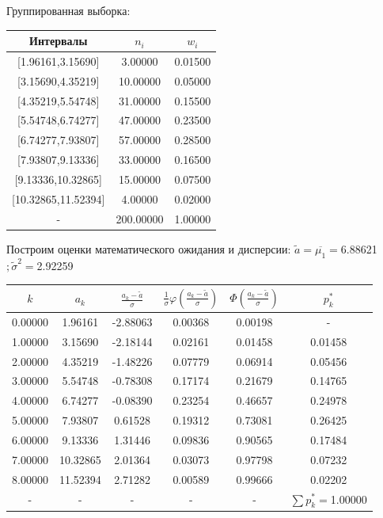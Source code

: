 \newpage%
Группированная выборка:\newline%
\newline%
%
\begin{tabular}{|c|c|c|}%
\hline%
Интервалы&$n_i$&$w_i$\\%
\hline%
{[}1.96161,3.15690{]}&3.00000&0.01500\\%
\hline%
{[}3.15690,4.35219{]}&10.00000&0.05000\\%
\hline%
{[}4.35219,5.54748{]}&31.00000&0.15500\\%
\hline%
{[}5.54748,6.74277{]}&47.00000&0.23500\\%
\hline%
{[}6.74277,7.93807{]}&57.00000&0.28500\\%
\hline%
{[}7.93807,9.13336{]}&33.00000&0.16500\\%
\hline%
{[}9.13336,10.32865{]}&15.00000&0.07500\\%
\hline%
{[}10.32865,11.52394{]}&4.00000&0.02000\\%
\hline%
{-}&200.00000&1.00000\\%
\hline%
\end{tabular}%
\newline%
\newline%
%
Построим оценки математического ожидания и дисперсии:\newline%
\newline%
%
$\widetilde{a} = \overline{\mu_1}=$6.88621$;\widetilde{\sigma}^2 =$2.92259%
\newpage%
\begin{tabular}{|c|c|c|c|c|c|}%
\hline%
$k$&$a_k$&$\frac{a_k - \widetilde{a}}{\sigma}$&$\frac{1}{\sigma} \varphi( \frac{a_k - \widetilde{a}}{\sigma} )$&$ \Phi( \frac{a_k - \widetilde{a}}{\sigma} )$&$p_{k}^*$\\%
\hline%
0.00000&1.96161&{-}2.88063&0.00368&0.00198&{-}\\%
\hline%
1.00000&3.15690&{-}2.18144&0.02161&0.01458&0.01458\\%
\hline%
2.00000&4.35219&{-}1.48226&0.07779&0.06914&0.05456\\%
\hline%
3.00000&5.54748&{-}0.78308&0.17174&0.21679&0.14765\\%
\hline%
4.00000&6.74277&{-}0.08390&0.23254&0.46657&0.24978\\%
\hline%
5.00000&7.93807&0.61528&0.19312&0.73081&0.26425\\%
\hline%
6.00000&9.13336&1.31446&0.09836&0.90565&0.17484\\%
\hline%
7.00000&10.32865&2.01364&0.03073&0.97798&0.07232\\%
\hline%
8.00000&11.52394&2.71282&0.00589&0.99666&0.02202\\%
\hline%
{-}&{-}&{-}&{-}&{-}&$\sum p_{k}^*=$1.00000\\%
\hline%
\end{tabular}%
